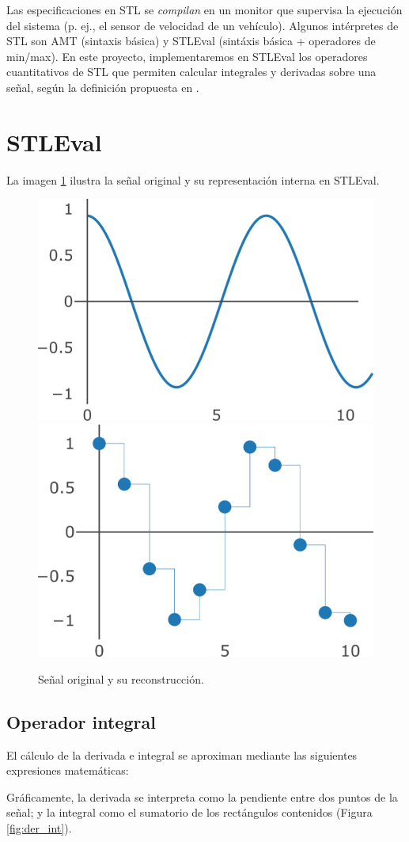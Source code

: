 Las especificaciones en STL se \textit{compilan} en un monitor que supervisa la ejecución del sistema (p. ej., el sensor de velocidad de un vehículo). Algunos intérpretes de STL son AMT \cite{AMT2} (sintaxis básica) y STLEval \cite{StlEval} (sintáxis básica + operadores de min/max). En este proyecto, implementaremos en STLEval los operadores cuantitativos de STL que permiten calcular integrales y derivadas sobre una señal, según la definición propuesta en \cite{Stl_Der_Int}.

\section{STLEval}

La imagen \ref{fig:senal} ilustra la señal original y su representación interna en STLEval. 

\begin{figure}
\centering
  \includegraphics[width=.4\linewidth]{images/senal_original} \hfill
  \includegraphics[width=.4\linewidth]{images/senal_muestreada}
\caption{Señal original y su reconstrucción.}
\label{fig:senal}
\end{figure}

\subsection{Operador integral}

El cálculo de la derivada e integral se aproximan mediante las siguientes expresiones matemáticas:


Gráficamente, la derivada se interpreta como la pendiente entre dos puntos de la señal; y la integral como el sumatorio de los rectángulos contenidos (Figura \ref{fig:der_int}).


